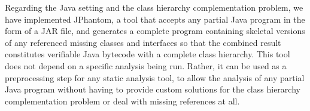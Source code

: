 Regarding the Java setting and the class hierarchy complementation
problem, we have implemented JPhantom, a tool that accepts any partial
Java program in the form of a JAR file, and generates a complete
program containing skeletal versions of any referenced missing classes
and interfaces so that the combined result constitutes verifiable Java
bytecode with a complete class hierarchy. This tool does not depend on
a specific analysis being run. Rather, it can be used as a
preprocessing step for any static analysis tool, to allow the analysis
of any partial Java program without having to provide custom solutions
for the class hierarchy complementation problem or deal with missing
references at all.

